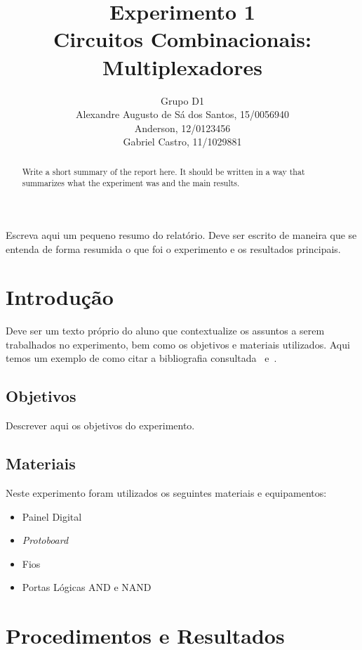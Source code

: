 \documentclass[12pt]{article}
\title{Experimento 1\\ 
Circuitos Combinacionais: Multiplexadores}
\author{Grupo D1\\    %
        Alexandre Augusto de Sá dos Santos, 15/0056940\\
        Anderson,  12/0123456\\
        Gabriel Castro, 11/1029881\\
}
\begin{document}
 
\maketitle

 \begin{abstract}
Write a short summary of the report here. It should be written in a way that summarizes what the experiment was and the main results.
 \end{abstract}
    
 \begin{resumo} 
  Escreva aqui um pequeno resumo do relatório. Deve ser escrito de maneira que se entenda de forma resumida o que foi o experimento e os resultados principais.
 \end{resumo}


\section{Introdução}
\label{sec:Introducao}

Deve ser um texto próprio do aluno que contextualize os assuntos a serem trabalhados no experimento, bem como os objetivos e materiais utilizados. Aqui temos um exemplo de como citar a bibliografia consultada~\cite{boulic:91} e~\cite{smith:99}.

\subsection{Objetivos}
\label{sec:Objetivos}

Descrever aqui os objetivos do experimento.

\subsection{Materiais} 
\label{sec:Materiais}
Neste experimento foram utilizados os seguintes materiais e equipamentos:
\begin{itemize}
    \item Painel Digital

    \item \textit{Protoboard}
    
    \item Fios
    
    \item Portas Lógicas AND e NAND
\end{itemize}

\section{Procedimentos e Resultados}
\label{sec:Procedimentos}
\end{document}
